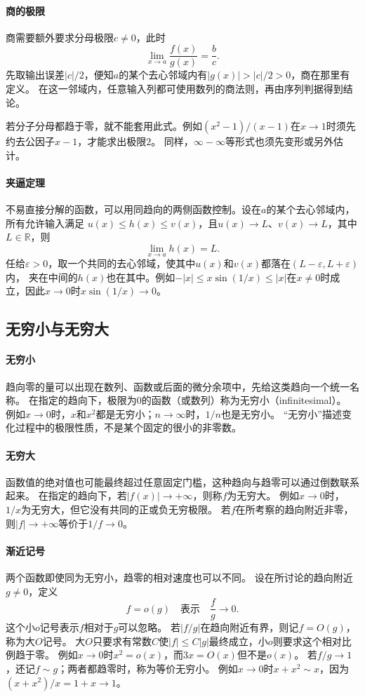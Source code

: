\paragraph{商的极限}
商需要额外要求分母极限$c\neq0$，此时
\[
 \lim_{x\to a}\frac{f(x)}{g(x)}=\frac bc.
\]
先取输出误差$|c|/2$，便知$a$的某个去心邻域内有$|g(x)|>|c|/2>0$，商在那里有定义。
在这一邻域内，任意输入列都可使用数列的商法则，再由序列判据得到结论。

若分子分母都趋于零，就不能套用此式。例如$(x^2-1)/(x-1)$在$x\to1$时须先约去公因子$x-1$，才能求出极限$2$。
同样，$\infty-\infty$等形式也须先变形或另外估计。

\paragraph{夹逼定理}
不易直接分解的函数，可以用同趋向的两侧函数控制。设在$a$的某个去心邻域内，所有允许输入满足
$u(x)\leq h(x)\leq v(x)$，且$u(x)\to L$、$v(x)\to L$，其中$L\in\mathbb R$，则
\[
 \lim_{x\to a}h(x)=L.
\]
任给$\varepsilon>0$，取一个共同的去心邻域，使其中$u(x)$和$v(x)$都落在$(L-\varepsilon,L+\varepsilon)$内，
夹在中间的$h(x)$也在其中。例如$-|x|\leq x\sin(1/x)\leq|x|$在$x\neq0$时成立，因此$x\to0$时$x\sin(1/x)\to0$。

\subsection{无穷小与无穷大}

\paragraph{无穷小}
趋向零的量可以出现在数列、函数或后面的微分余项中，先给这类趋向一个统一名称。
在指定的趋向下，极限为$0$的函数（或数列）称为无穷小（infinitesimal）。
例如$x\to0$时，$x$和$x^2$都是无穷小；$n\to\infty$时，$1/n$也是无穷小。
“无穷小”描述变化过程中的极限性质，不是某个固定的很小的非零数。

\paragraph{无穷大}
函数值的绝对值也可能最终超过任意固定门槛，这种趋向与趋零可以通过倒数联系起来。
在指定的趋向下，若$|f(x)|\to+\infty$，则称$f$为无穷大。
例如$x\to0$时，$1/x$为无穷大，但它没有共同的正或负无穷极限。
若$f$在所考察的趋向附近非零，则$|f|\to+\infty$等价于$1/f\to0$。

\paragraph{渐近记号}
\label{sec:comb-growth-scales}
两个函数即使同为无穷小，趋零的相对速度也可以不同。
设在所讨论的趋向附近$g\neq0$，定义
\[
 f=o(g)\quad\text{表示}\quad \frac{f}{g}\longrightarrow0.
\]
这个小$o$记号表示$f$相对于$g$可以忽略。
若$|f/g|$在趋向附近有界，则记$f=O(g)$，称为大$O$记号。
大$O$只要求有常数$C$使$|f|\leq C|g|$最终成立，小$o$则要求这个相对比例趋于零。
例如$x\to0$时$x^2=o(x)$，而$3x=O(x)$但不是$o(x)$。
若$f/g\to1$，还记$f\sim g$；两者都趋零时，称为等价无穷小。
例如$x\to0$时$x+x^2\sim x$，因为$(x+x^2)/x=1+x\to1$。

